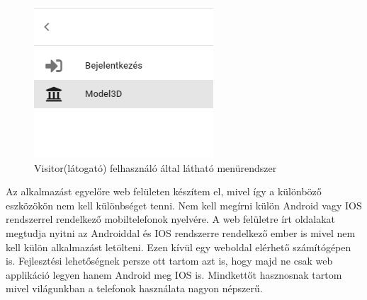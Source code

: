 \begin{figure}
	\centering
	\includegraphics[scale=0.7]{figures/images/drawbarevery.png}
	\caption{Visitor(látogató) felhasználó által látható menürendszer}
	\label{fig:drawbarevery}
\end{figure}

Az alkalmazást egyelőre web felületen készítem el, mivel így a különböző eszközökön nem kell különbséget tenni. Nem kell megírni külön Android vagy IOS rendszerrel rendelkező mobiltelefonok nyelvére. A web felületre írt oldalakat megtudja nyitni az Androiddal és IOS rendszerre rendelkező ember is mivel nem kell külön alkalmazást letölteni. Ezen kívül egy weboldal elérhető számítógépen is. Fejlesztési lehetőségnek persze ott tartom azt is, hogy majd ne csak web applikáció legyen hanem Android meg IOS is. Mindkettőt hasznosnak tartom mivel világunkban a telefonok használata nagyon népszerű.